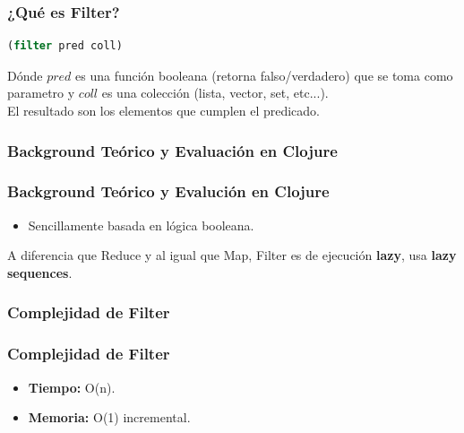 \documentclass{beamer}
\begin{document}

\begin{frame}[fragile]
    \frametitle{¿Qué es Filter?}
    \begin{center}
    \begin{lstlisting}[language=Clojure]
    (filter pred coll)  
    \end{lstlisting}
    \end{center}
    Dónde $pred$ es una función booleana (retorna falso/verdadero)  que se toma como parametro y $coll$ es una colección (lista, vector, set, etc...).\\
    El resultado son los elementos que cumplen el predicado.
\end{frame}
\subsubsection{Background Teórico y Evaluación en Clojure}
\begin{frame}[fragile]
    \frametitle{Background Teórico y Evalución en Clojure}
    \begin{itemize}
        \item Sencillamente basada en lógica booleana.
        
    \end{itemize}
    A diferencia que Reduce y al igual que Map, Filter es de ejecución \textbf{lazy}, usa 
    \textbf{lazy sequences}.
\end{frame}

\subsubsection{Complejidad de Filter}
\begin{frame}[fragile]
    \frametitle{Complejidad de Filter}

\begin{itemize}
    \item \textbf{Tiempo: } O(n).
    \item \textbf{Memoria: } O(1) incremental.
\end{itemize}
\end{frame}
\end{document}
